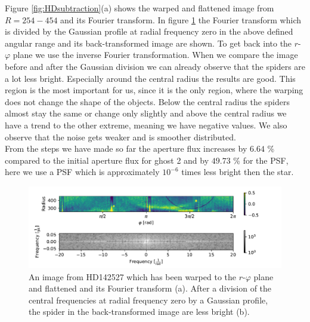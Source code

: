 Figure \ref{fig:HDsubtraction}(a) shows the warped and flattened image from $R=254-454$ and its Fourier transform. In figure \ref{fig:HDsuppcentralfreq_R254_R454_-0.5to0.5} the Fourier transform which is divided by the Gaussian profile at radial frequency zero in the above defined angular range and its back-transformed image are shown. To get back into the $r$-$\varphi$ plane we use the inverse Fourier transformation. When we compare the image before and after the Gaussian division we can already observe that the spiders are a lot less bright. Especially around the central radius the results are good. This region is the most important for us, since it is the only region, where the warping does not change the shape of the objects. Below the central radius the spiders almost stay the same or change only slightly and above the central radius we have a trend to the other extreme, meaning we have negative values. We also observe that the noise gets weaker and is smoother distributed.\\
From the steps we have made so far the aperture flux increases by $6.64$ \% compared to the initial aperture flux for ghost 2 and by $49.73$ \% for the PSF, here we use a PSF which is approximately $10^{-6}$ times less bright then the star. 
\begin{figure}[H]
	\centering
		\includegraphics[width=1.1\textwidth]{pics/HDsupprcentralfreq_R254_R454_-0.5to0.5.pdf}
		\caption{An image from HD142527 which has been warped to the $r$-$\varphi$ plane and flattened and its Fourier transform (a). After a division of the central frequencies at radial frequency zero by a Gaussian profile, the spider in the back-transformed image are less bright (b).}
\label{fig:HDsuppcentralfreq_R254_R454_-0.5to0.5}
\end{figure}


